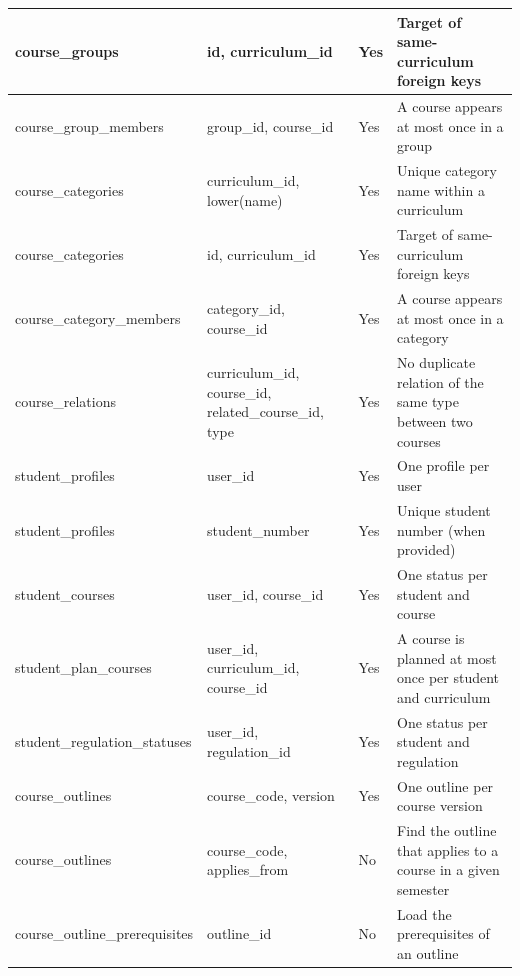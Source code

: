 \begin{longtable}{|p{}|p{}|p{}|p{}|}
\hline
course\_\allowbreak{}groups & id, curriculum\_\allowbreak{}id & Yes & Target of same-curriculum foreign keys \\
\hline
course\_\allowbreak{}group\_\allowbreak{}members & group\_\allowbreak{}id, course\_\allowbreak{}id & Yes & A course appears at most once in a group \\
\hline
course\_\allowbreak{}categories & curriculum\_\allowbreak{}id, lower(name) & Yes & Unique category name within a curriculum \\
\hline
course\_\allowbreak{}categories & id, curriculum\_\allowbreak{}id & Yes & Target of same-curriculum foreign keys \\
\hline
course\_\allowbreak{}category\_\allowbreak{}members & category\_\allowbreak{}id, course\_\allowbreak{}id & Yes & A course appears at most once in a category \\
\hline
course\_\allowbreak{}relations & curriculum\_\allowbreak{}id, course\_\allowbreak{}id, related\_\allowbreak{}course\_\allowbreak{}id, type & Yes & No duplicate relation of the same type between two courses \\
\hline
student\_\allowbreak{}profiles & user\_\allowbreak{}id & Yes & One profile per user \\
\hline
student\_\allowbreak{}profiles & student\_\allowbreak{}number & Yes & Unique student number (when provided) \\
\hline
student\_\allowbreak{}courses & user\_\allowbreak{}id, course\_\allowbreak{}id & Yes & One status per student and course \\
\hline
student\_\allowbreak{}plan\_\allowbreak{}courses & user\_\allowbreak{}id, curriculum\_\allowbreak{}id, course\_\allowbreak{}id & Yes & A course is planned at most once per student and curriculum \\
\hline
student\_\allowbreak{}regulation\_\allowbreak{}statuses & user\_\allowbreak{}id, regulation\_\allowbreak{}id & Yes & One status per student and regulation \\
\hline
course\_\allowbreak{}outlines & course\_\allowbreak{}code, version & Yes & One outline per course version \\
\hline
course\_\allowbreak{}outlines & course\_\allowbreak{}code, applies\_\allowbreak{}from & No & Find the outline that applies to a course in a given semester \\
\hline
course\_\allowbreak{}outline\_\allowbreak{}prerequisites & outline\_\allowbreak{}id & No & Load the prerequisites of an outline \\
\hline
\end{longtable}
\endgroup

